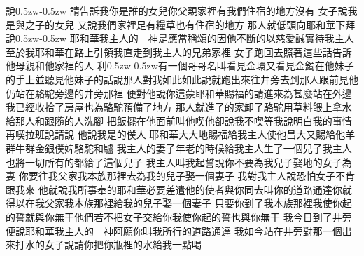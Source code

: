 說\kern0.5zw\chientien\kern-0.5zw 請告訴我\chientien 你是誰的女兒\chientien 你父親家裡有我們住宿的地方沒有\chuan 
{}女子說\chientien 我是與之子的女兒\yuentien 
{}又說\chientien 我們家裡足有糧草\chientien 也有住宿的地方\chuan 
{}那人就低頭向耶和華下拜\chientien 
{}說\kern0.5zw\chientien\kern-0.5zw 耶和華我主人的　神是應當稱頌的\chientien 因他不斷的以慈愛誠實待我主人\yuentien 至於我\chientien 耶和華在路上引領我\chientien 直走到我主人的兄弟家裡\chuan\Chuan
{}女子跑回去\chientien 照著這些話告訴他母親和他家裡的人\chuan 
{}利\kern0.5zw\kern-0.5zw有一個哥哥\chientien 名叫\chientien 看見金環\chientien 又看見金鐲在他妹子的手上\chientien 並聽見他妹子的話\chientien 說\chientien 那人對我如此如此說\chientien{}就跑出來往井旁去\chientien 到那人跟前\chientien 見他仍站在駱駝旁邊的井旁那裡\yuentien%
便對他說\chientien 你這蒙耶和華賜福的\chientien 請進來\chientien 為甚麼站在外邊\chientien 我已經收拾了房屋\chientien 也為駱駝預備了地方\chuan 
{}那人就進了的家\yuentien{}卸了駱駝\chientien 用草料餵上\chientien 拿水給那人和跟隨的人洗腳\chuan 
{}把飯擺在他面前\chientien 叫他喫\chientien 他卻說\chientien 我不喫\chientien 等我說明白我的事情再喫\chientien 拉班說\chientien 請說\chuan 
{}他說\chientien 我是的僕人\chuan 
{}耶和華大大地賜福給我主人\chientien 使他昌大\yuentien 又賜給他羊群\chientien 牛群\chientien 金銀\chientien 僕婢\chientien 駱駝\chientien 和驢\chuan 
{}我主人的妻子年老的時候\chientien 給我主人生了一個兒子\yuentien 我主人也將一切所有的都給了這個兒子\chuan 
{}我主人叫我起誓說\chientien 你不要為我兒子娶地的女子為妻\yuentien 
{}你要往我父家\chientien 我本族那裡去\chientien 為我的兒子娶一個妻子\chuan 
{}我對我主人說\chientien 恐怕女子不肯跟我來\chuan 
{}他就說\chientien 我所事奉的耶和華必要差遣他的使者與你同去\chientien 叫你的道路通達\yuentien 你就得以在我父家\chientien 我本族那裡\chientien 給我的兒子娶一個妻子\chuan 
{}只要你到了我本族那裡\chientien 我使你起的誓\chientien 就與你無干\chientien 他們若不把女子交給你\chientien 我使你起的誓也與你無干\chuan 
{}我今日到了井旁\chientien 便說\chientien 耶和華我主人的　神阿\chientien 願你叫我所行的道路通達\yuentien 
{}我如今站在井旁\chientien 對那一個出來打水的女子說\chientien 請你把你瓶裡的水給我一點喝\yuentien 
